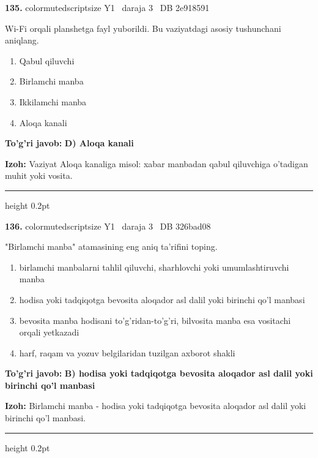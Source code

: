 \documentclass[10pt,a4paper,oneside]{article}
\begin{document}
\noindent\textbf{\color{ink}135.}  {color{muted}scriptsize Y1 \textbullet\ daraja 3 \textbullet\ DB 2e918591}
\par
Wi-Fi orqali planshetga fayl yuborildi. Bu vaziyatdagi asosiy tushunchani aniqlang.
\begin{enumerate}[label=\Alph*),leftmargin=9mm]
\item Qabul qiluvchi
\item Birlamchi manba
\item Ikkilamchi manba
\item Aloqa kanali
\end{enumerate}
\begin{tcolorbox}[enhanced,breakable,colback=teal!4,colframe=teal!50!black,boxrule=0.5pt,arc=1.1mm,left=3mm,right=3mm,top=1.7mm,bottom=1.7mm,before skip=2mm,after skip=2mm]
\textbf{\color{teal}To'g'ri javob:} \textbf{D) Aloqa kanali}
\par\smallskip
\textbf{Izoh:} Vaziyat Aloqa kanaliga misol: xabar manbadan qabul qiluvchiga o'tadigan muhit yoki vosita.
\end{tcolorbox}
\vspace{2mm}\hrule height 0.2pt \vspace{3mm}

\noindent\textbf{\color{ink}136.}  {color{muted}scriptsize Y1 \textbullet\ daraja 3 \textbullet\ DB 326bad08}
\par
"Birlamchi manba" atamasining eng aniq ta'rifini toping.
\begin{enumerate}[label=\Alph*),leftmargin=9mm]
\item birlamchi manbalarni tahlil qiluvchi, sharhlovchi yoki umumlashtiruvchi manba
\item hodisa yoki tadqiqotga bevosita aloqador asl dalil yoki birinchi qo'l manbasi
\item bevosita manba hodisani to'g'ridan-to'g'ri, bilvosita manba esa vositachi orqali yetkazadi
\item harf, raqam va yozuv belgilaridan tuzilgan axborot shakli
\end{enumerate}
\begin{tcolorbox}[enhanced,breakable,colback=teal!4,colframe=teal!50!black,boxrule=0.5pt,arc=1.1mm,left=3mm,right=3mm,top=1.7mm,bottom=1.7mm,before skip=2mm,after skip=2mm]
\textbf{\color{teal}To'g'ri javob:} \textbf{B) hodisa yoki tadqiqotga bevosita aloqador asl dalil yoki birinchi qo'l manbasi}
\par\smallskip
\textbf{Izoh:} Birlamchi manba - hodisa yoki tadqiqotga bevosita aloqador asl dalil yoki birinchi qo'l manbasi.
\end{tcolorbox}
\vspace{2mm}\hrule height 0.2pt \vspace{3mm}
\end{document}
